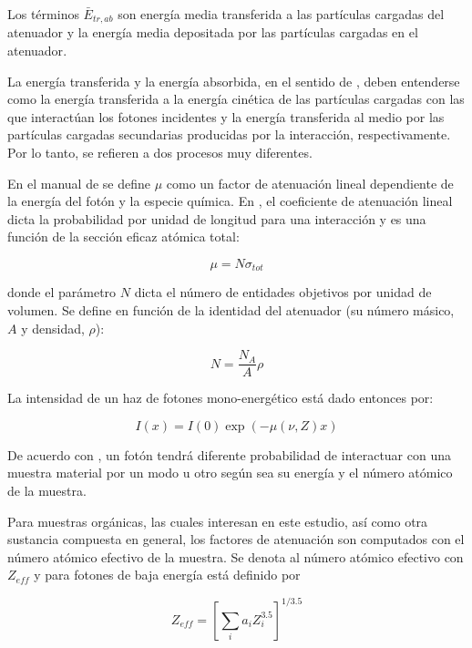 \documentclass[12pt,letterpaper, oneside]{book}
\begin{document}
	 Los términos $\bar{E}_{tr, ab}$ son energía media transferida a las partículas cargadas del atenuador y la energía media depositada por las partículas cargadas en el atenuador\cite{Podgorsak.2016, IAEA.2005}. 
	
	 La energía transferida y la energía absorbida, en el sentido de \cite{Podgorsak.2016}, deben entenderse como la energía transferida a la energía cinética de las partículas cargadas con las que interactúan los fotones incidentes y la energía transferida al medio por las partículas cargadas secundarias producidas por la interacción, respectivamente. Por lo tanto, se refieren a dos procesos muy diferentes. 
	 
	 En el manual de \cite{IAEA.2005} se define $\mu$ como un factor de atenuación lineal dependiente de la energía del fotón y la especie química. En \cite{Mayles.2007}, el coeficiente de atenuación lineal dicta la probabilidad por unidad de longitud para una interacción y es una función de la sección eficaz atómica total:
	 
	 $$\mu=N \sigma_{tot}$$
	 
	 \noindent donde el parámetro $N$ dicta el número de entidades objetivos por unidad de volumen. Se define en función de la identidad del atenuador (su número másico, $A$ y densidad, $\rho$):
	 
	 $$N=\frac{N_A}{A}\rho$$	 
	 
	 La intensidad de un haz de fotones mono-energético está dado entonces por:
	 
	 \begin{equation}
	 	I(x)=I(0)\exp(-\mu(\nu, Z)x)\label{photon_beam_intensity}
	 \end{equation}
	 
	 De acuerdo con \cite{IAEA.2005}, un fotón tendrá diferente probabilidad de interactuar con una muestra material por un modo u otro según sea su energía y el número atómico de la muestra. 
	 
	 Para muestras orgánicas, las cuales interesan en este estudio, así como otra sustancia compuesta en general, los factores de atenuación son computados con el número atómico efectivo de la muestra\cite{IAEA.2005}. Se denota al número atómico efectivo con $Z_{eff}$ y para fotones de baja energía está definido por
	 
	 \begin{equation}
	 	Z_{eff}=\left[\sum_{i}a_i Z_i^{3.5}\right]^{1/3.5}\label{numero_atomico_efectivo}
	 \end{equation}
	 
\end{document}
